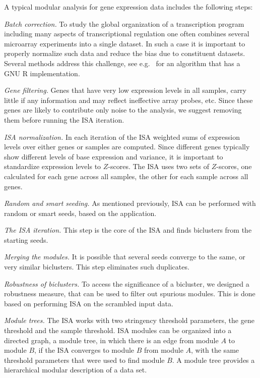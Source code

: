 \documentclass{bioinfo}
\begin{document}
A typical modular analysis for gene expression data includes the following
steps:

\emph{Batch correction.}
To study the global organization of a transcription program including
many aspects of transcriptional regulation one often combines several
microarray experiments into a single dataset. In such a case it is important
to properly normalize such data and reduce the bias due to constituent
datasets. Several methods address this challenge,
see e.g.~\citep{johnson07} for an algorithm that has a GNU R
implementation. 

\emph{Gene filtering.}
Genes that have very low expression levels in all samples, carry little if
any information and may reflect ineffective array probes, etc. Since these
genes are likely to contribute only noise to the analysis, we suggest
removing them before running the ISA iteration.

\emph{ISA normalization.}
In each iteration of the ISA weighted sums of expression levels over either
genes or samples are computed. Since different genes
typically show different levels of base
expression and variance, it is important to standardize expression
levels to $Z$-scores. The ISA uses two sets of $Z$-scores, one
calculated for each gene across all samples, the other for each sample
across all genes.

\emph{Random and smart seeding.}
As mentioned previously, ISA can be performed with random or smart
seeds, based on the application.

\emph{The ISA iteration.}
This step is the core of the ISA and finds biclusters from the
starting seeds.

\emph{Merging the modules.}
It is possible that several seeds converge to the same, or very similar
biclusters. This step eliminates such duplicates.

\emph{Robustness of biclusters.}
To access the significance of a bicluster, we designed a robustness
measure, that can be used to filter out spurious modules. This is done
based on performing ISA on the scrambled input data.

\emph{Module trees.}
The ISA works with two stringency threshold parameters, the gene
threshold and the sample threshold. ISA modules can be organized into
a directed graph, a module tree, in which there is an edge from module
$A$ to module $B$, if the ISA converges to module $B$ from module $A$,
with the same threshold parameters  that were used to find module
$B$. A module tree provides a hierarchical modular description of a
data set.
\end{document}

